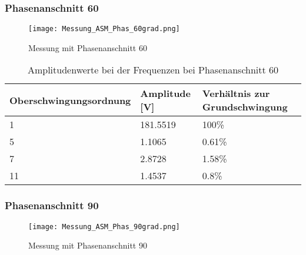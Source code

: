 \subsubsection*{Phasenanschnitt 60\textdegree}
\begin{figure}[ht!]
	\centering
	\texttt{[image: Messung\_ASM\_Phas\_60grad.png]}	
	\caption{Messung mit Phasenanschnitt 60\textdegree}\label{fig:Mess_ASM_Phas60}
\end{figure}

\begin{table}[ht!]
	\centering
	\begin{tabular}{|l|l|l|}
		\hline
		Oberschwingungsordnung & Amplitude {[}V{]} & Verhältnis zur Grundschwingung \\ \hline
		1                      & 181.5519          & 100\%                          \\ \hline
		5                      & 1.1065            & 0.61\%                         \\ \hline
		7                      & 2.8728            & 1.58\%                         \\ \hline
		11                     & 1.4537            & 0.8\%                          \\ \hline
	\end{tabular}
\caption{Amplitudenwerte bei der Frequenzen bei Phasenanschnitt 60\textdegree}\label{tab:Mess_Spannung_ASM_Phas60}
\end{table}

\newpage
\subsubsection*{Phasenanschnitt 90\textdegree}
\begin{figure}[ht!]
	\centering
	\texttt{[image: Messung\_ASM\_Phas\_90grad.png]}	
	\caption{Messung mit Phasenanschnitt 90\textdegree}\label{fig:Mess_ASM_Phas90}
\end{figure}

